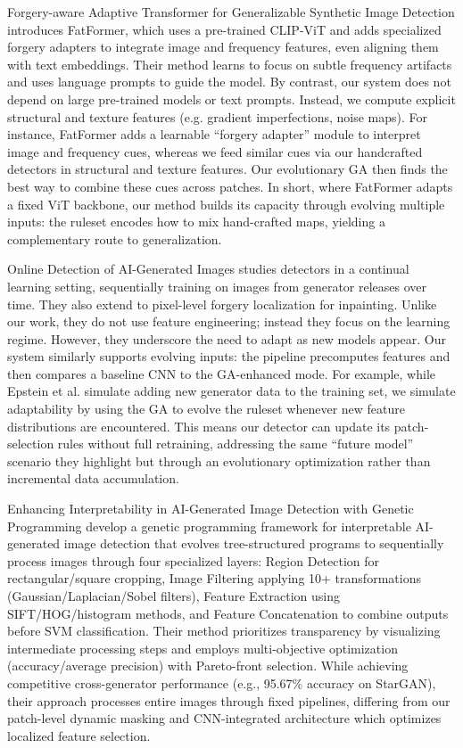 \documentclass[runningheads]{llncs}
\begin{document}
Forgery-aware Adaptive Transformer for Generalizable Synthetic Image Detection \cite{liu2024fatformer} introduces FatFormer, which uses a pre-trained CLIP-ViT and adds specialized forgery adapters to integrate image and frequency features, even aligning them with text embeddings. Their method learns to focus on subtle frequency artifacts and uses language prompts to guide the model. By contrast, our system does not depend on large pre-trained models or text prompts. Instead, we compute explicit structural and texture features (e.g. gradient imperfections, noise maps). For instance, FatFormer adds a learnable ``forgery adapter'' module to interpret image and frequency cues, whereas we feed similar cues via our handcrafted detectors in structural and texture features. Our evolutionary GA then finds the best way to combine these cues across patches. In short, where FatFormer adapts a fixed ViT backbone, our method builds its capacity through evolving multiple inputs: the ruleset encodes how to mix hand-crafted maps, yielding a complementary route to generalization.

Online Detection of AI-Generated Images \cite{epstein2023online} studies detectors in a continual learning setting, sequentially training on images from generator releases over time. They also extend to pixel-level forgery localization for inpainting. Unlike our work, they do not use feature engineering; instead they focus on the learning regime. However, they underscore the need to adapt as new models appear. Our system similarly supports evolving inputs: the pipeline precomputes features and then compares a baseline CNN to the GA-enhanced mode. For example, while Epstein et al. simulate adding new generator data to the training set, we simulate adaptability by using the GA to evolve the ruleset whenever new feature distributions are encountered. This means our detector can update its patch-selection rules without full retraining, addressing the same ``future model'' scenario they highlight but through an evolutionary optimization rather than incremental data accumulation.

Enhancing Interpretability in AI-Generated Image Detection with Genetic Programming \cite{lin2023genetic} develop a genetic programming framework for interpretable AI-generated image detection that evolves tree-structured programs to sequentially process images through four specialized layers: Region Detection for rectangular/square cropping, Image Filtering applying 10+ transformations (Gaussian/Laplacian/Sobel filters), Feature Extraction using SIFT/HOG/histogram methods, and Feature Concatenation to combine outputs before SVM classification. Their method prioritizes transparency by visualizing intermediate processing steps and employs multi-objective optimization (accuracy/average precision) with Pareto-front selection. While achieving competitive cross-generator performance (e.g., 95.67\% accuracy on StarGAN), their approach processes entire images through fixed pipelines, differing from our patch-level dynamic masking and CNN-integrated architecture which optimizes localized feature selection.
\end{document}
